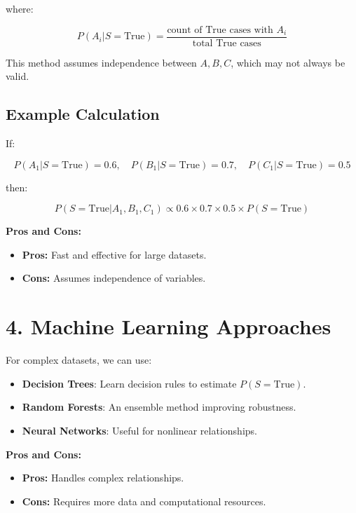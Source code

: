 \documentclass{article}
\begin{document}
where:

\[
P(A_i | S = \text{True}) = \frac{\text{count of True cases with } A_i}{\text{total True cases}}
\]

This method assumes independence between \( A, B, C \), which may not always be valid.

\subsection{Example Calculation}
If:

\[
P(A_1 | S = \text{True}) = 0.6, \quad P(B_1 | S = \text{True}) = 0.7, \quad P(C_1 | S = \text{True}) = 0.5
\]

then:

\[
P(S = \text{True} | A_1, B_1, C_1) \propto 0.6 \times 0.7 \times 0.5 \times P(S = \text{True})
\]

\textbf{Pros and Cons:}
\begin{itemize}
    \item \textbf{Pros:} Fast and effective for large datasets.
    \item \textbf{Cons:} Assumes independence of variables.
\end{itemize}

\section{4. Machine Learning Approaches}
For complex datasets, we can use:
\begin{itemize}
    \item \textbf{Decision Trees}: Learn decision rules to estimate \( P(S = \text{True}) \).
    \item \textbf{Random Forests}: An ensemble method improving robustness.
    \item \textbf{Neural Networks}: Useful for nonlinear relationships.
\end{itemize}

\textbf{Pros and Cons:}
\begin{itemize}
    \item \textbf{Pros:} Handles complex relationships.
    \item \textbf{Cons:} Requires more data and computational resources.
\end{itemize}
\end{document}
